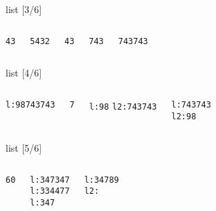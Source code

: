 \documentclass[xcolor={dvipsnames, svgnames, x11names, table}, 10pt]{beamer}
\begin{document}
\begin{frame}[t, fragile]{list [3/6]}

\begin{columns}


    \texttt{43}
    
    \texttt{5432}
    
    \texttt{43}
    
    \texttt{743}
    
    \texttt{743743}
    
\end{columns}

\end{frame}

\begin{frame}[t, fragile]{list [4/6]}

\begin{columns}
    

    \texttt{l:98743743}
    
    \texttt{7}
    
    \texttt{l:98}
    \texttt{l2:743743}
    
    \texttt{l:743743}\\
    \texttt{l2:98}
    
\end{columns}

\end{frame}

\begin{frame}[t, fragile]{list [5/6]}

\begin{columns}
    

    \texttt{6}\texttt{0}
    
    \texttt{l:347347}\\
    \texttt{l:334477}\\
    \texttt{l:347}
    
    \texttt{l:34789}\\
    \texttt{l2:}
    
\end{columns}

\end{frame}
\end{document}

